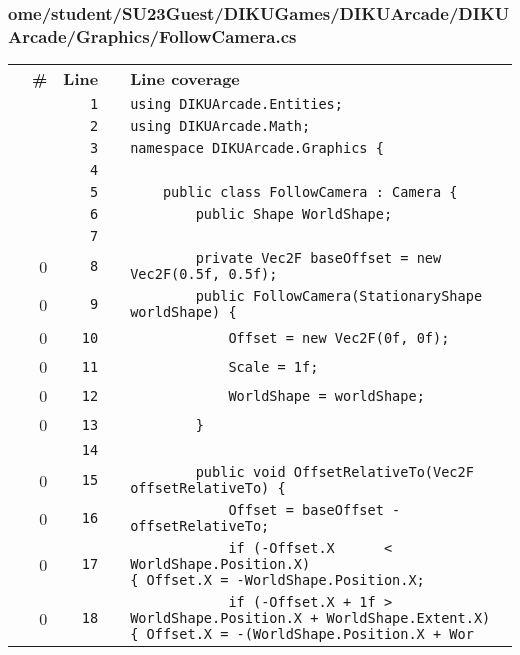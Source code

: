 \documentclass[a4paper,landscape,10pt]{article}
\begin{document}
\subsubsection{ome/student/SU23Guest/DIKUGames/DIKUArcade/DIKUArcade/Graphics/FollowCamera.cs}
\begin{longtable}[l]{lrrll}
\textbf{} & \textbf{\#} & \textbf{Line} & \textbf{} & \textbf{Line coverage}\\
\cellcolor{gray} &  & \verb~1~ & & \verb~using DIKUArcade.Entities;~\\
\cellcolor{gray} &  & \verb~2~ & & \verb~using DIKUArcade.Math;~\\
\cellcolor{gray} &  & \verb~3~ & & \verb~namespace DIKUArcade.Graphics {~\\
\cellcolor{gray} &  & \verb~4~ & & \verb~~\\
\cellcolor{gray} &  & \verb~5~ & & \verb~    public class FollowCamera : Camera {~\\
\cellcolor{gray} &  & \verb~6~ & & \verb~        public Shape WorldShape;~\\
\cellcolor{gray} &  & \verb~7~ & & \verb~~\\
\cellcolor{red} & 0 & \verb~8~ & & \verb~        private Vec2F baseOffset = new Vec2F(0.5f, 0.5f);~\\
\cellcolor{red} & 0 & \verb~9~ & & \verb~        public FollowCamera(StationaryShape worldShape) {~\\
\cellcolor{red} & 0 & \verb~10~ & & \verb~            Offset = new Vec2F(0f, 0f);~\\
\cellcolor{red} & 0 & \verb~11~ & & \verb~            Scale = 1f;~\\
\cellcolor{red} & 0 & \verb~12~ & & \verb~            WorldShape = worldShape;~\\
\cellcolor{red} & 0 & \verb~13~ & & \verb~        }~\\
\cellcolor{gray} &  & \verb~14~ & & \verb~~\\
\cellcolor{red} & 0 & \verb~15~ & & \verb~        public void OffsetRelativeTo(Vec2F offsetRelativeTo) {~\\
\cellcolor{red} & 0 & \verb~16~ & & \verb~            Offset = baseOffset - offsetRelativeTo;~\\
\cellcolor{red} & 0 & \verb~17~ & & \verb~            if (-Offset.X      < WorldShape.Position.X)                            { Offset.X = -WorldShape.Position.X; ~\\
\cellcolor{red} & 0 & \verb~18~ & & \verb~            if (-Offset.X + 1f > WorldShape.Position.X + WorldShape.Extent.X) { Offset.X = -(WorldShape.Position.X + Wor~\\

\end{longtable}
\end{document}
